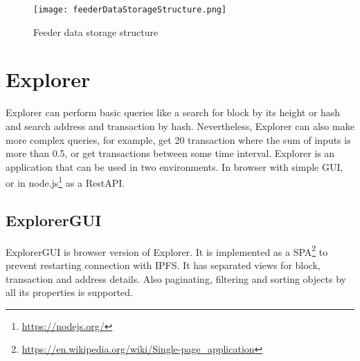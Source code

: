 \begin{figure}[h]
    \centering
    \texttt{[image: feederDataStorageStructure.png]}
    \caption{Feeder data storage structure}
    \label{feederDataStorageStructure}
\end{figure}



\section{Explorer}
Explorer can perform basic queries like a search for block by its height or hash and search address and transaction by hash. Nevertheless, Explorer can also make more complex queries, for example, get 20 transaction where the sum of inputs is more than 0.5, or get transactions between some time interval. Explorer is an application that can be used in two environments. In browser with simple GUI, or in node.js\footnote{\url{https://nodejs.org/}} as a RestAPI.

\subsection{ExplorerGUI}
ExplorerGUI is browser version of Explorer. It is implemented as a SPA\footnote{\url{https://en.wikipedia.org/wiki/Single-page_application}} to prevent restarting connection with IPFS. It has separated views for block, transaction and address details. Also paginating, filtering and sorting objects by all its properties is supported.

